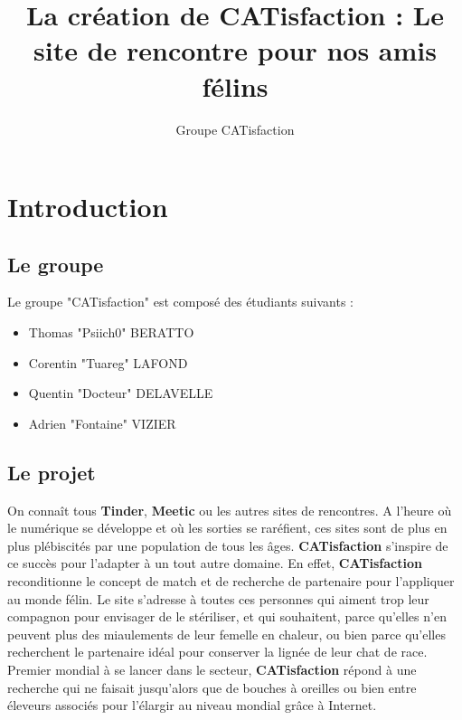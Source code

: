 \documentclass{article}
\author{Groupe CATisfaction}
\title{La création de CATisfaction : Le site de rencontre pour nos amis félins}
\begin{document}
\maketitle
\newpage

\tableofcontents
\newpage


\section{Introduction}

\subsection{Le groupe}
Le groupe "CATisfaction" est composé des étudiants suivants : 
\begin{itemize}
\item Thomas "Psiich0" BERATTO 
\item Corentin "Tuareg" LAFOND
\item Quentin "Docteur" DELAVELLE
\item Adrien "Fontaine" VIZIER
\end{itemize}

\subsection{Le projet}
On connaît tous \textbf{Tinder}, \textbf{Meetic} ou les autres sites de rencontres. A l'heure où le numérique se développe et où les sorties se raréfient, ces sites sont de plus en plus plébiscités par une population de tous les âges. \textbf{CATisfaction} s'inspire de ce succès pour l'adapter à un tout autre domaine. En effet, \textbf{CATisfaction} reconditionne le concept de match et de recherche de partenaire pour l'appliquer au monde félin. Le site s'adresse à toutes ces personnes qui aiment trop leur compagnon pour envisager de le stériliser, et qui souhaitent, parce qu'elles n'en peuvent plus des miaulements de leur femelle en chaleur, ou bien parce qu'elles recherchent le partenaire idéal pour conserver la lignée de leur chat de race.
\newline
\newline
Premier mondial à se lancer dans le secteur, \textbf{CATisfaction} répond à une recherche qui ne faisait jusqu'alors que de bouches à oreilles ou bien entre éleveurs associés pour l'élargir au niveau mondial grâce à Internet.
\end{document}
